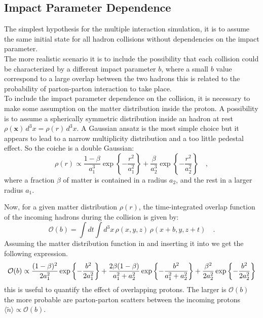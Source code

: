 \subsection{Impact Parameter Dependence}

The simplest hypothesis for the multiple interaction simulation, it is to assume the same initial state for all hadron collisions without dependencies on the impact parameter. 
\\
The more realistic scenario it is to include the possibility that each collision could be characterized by a different impact parameter $b$, where a small $b$ value correspond to a large overlap between the two hadrons this is related to the probability of parton-parton interaction to take place.
\\
To include the impact parameter dependence on the collision, it is necessary to make some assumption on the matter distribution inside the proton. A possibility is to assume a spherically symmetric distribution inside an hadron at rest $\rho(\mathbf{x})\,d^3x=\rho(r)\,d^3x$. A Gaussian ansatz is the most simple choice but it appears to lead to a narrow multiplicity distribution and a too little pedestal effect. So the coiche is a double Gaussian:
\begin{equation}
	\rho(r) \propto \frac{1-\beta}{a_1^3}\exp\left\{-\frac{r^2}{a_1^2}\right\}+\frac{\beta}{a_2^3}\exp\left\{ -\frac{r^2}{a_2^2} \right\}\quad,
	\label{eq:matterDistribution}
\end{equation}
where a fraction $\beta$ of matter is contained in a radius $a_2$, and the rest in a larger radius $a_1$.

\medskip

Now, for a given matter distribution $\rho(r)$,  the time-integrated overlap function of the incoming hadrons during the collision is given by:
\begin{equation}
	\mathcal{O}(b)=\displaystyle\int dt \displaystyle\int d^3x\,\rho(x,y,z)\,\rho(x+b,y,z+t)\quad.
	\label{eq:overlappingFunction}
\end{equation} 
Assuming the matter distribution function in  and inserting it into  we get  the following expression.
\begin{equation}
\small{
	\mathcal{O}(b)\propto \frac{(1-\beta)^2}{2a_1^2}\exp\left\{-\frac{b^2}{2a_1^2}\right\}+\frac{2\beta(1-\beta)}{a_1^2+a_2^2}\exp\left\{ -\frac{b^2}{a_1^2+a_2^2} \right\}+\frac{\beta^2}{2a_2^2}\exp\left\{-\frac{b^2}{2a_2^2}\right\}
	}
\end{equation}
this is useful to quantify the effect of overlapping protons.
The larger is $\mathcal{O}(b)$ the more probable are parton-parton scatters between the incoming protons $\langle \widetilde{n} \rangle\propto \mathcal{O}(b)$.


